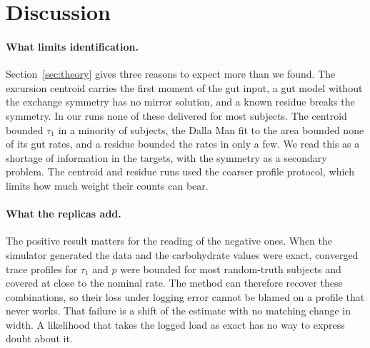 \section{Discussion}
\label{sec:discussion}

\paragraph{What limits identification.}
Section~\ref{sec:theory} gives three reasons to expect more than we found.
The excursion centroid carries the first moment of the gut input, a gut model without the exchange symmetry has no mirror solution, and a known residue breaks the symmetry.
In our runs none of these delivered for most subjects.
The centroid bounded $\tau_1$ in a minority of subjects, the Dalla Man fit to the area bounded none of its gut rates, and a residue bounded the rates in only a few.
We read this as a shortage of information in the targets, with the symmetry as a secondary problem.
The centroid and residue runs used the coarser profile protocol, which limits how much weight their counts can bear.

\paragraph{What the replicas add.}
The positive result matters for the reading of the negative ones.
When the simulator generated the data and the carbohydrate values were exact, converged trace profiles for $\tau_1$ and $p$ were bounded for most random-truth subjects and covered at close to the nominal rate.
The method can therefore recover these combinations, so their loss under logging error cannot be blamed on a profile that never works.
That failure is a shift of the estimate with no matching change in width.
A likelihood that takes the logged load as exact has no way to express doubt about it.


